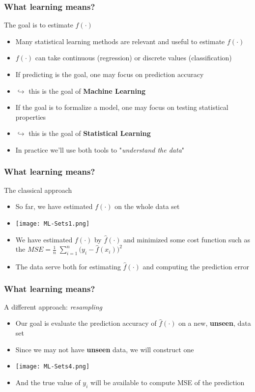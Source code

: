 \documentclass[xcolor=x11names,compress, aspectratio=169]{beamer}
\renewcommand{\(}{\begin{columns}}
\renewcommand{\)}{\end{columns}}
\newcommand{\<}[1]{\begin{column}{#1}}
\renewcommand{\>}{\end{column}}
\begin{document}
\begin{frame}
\frametitle{\textcolor{brique}{ What learning means?}}
The goal is to estimate $f(\cdot)$
\begin{itemize}[<+->]
\item Many statistical learning methods are relevant and useful to estimate $f(\cdot)$
\item $f(\cdot)$ can take continuous (regression) or discrete values (classification)
\item If predicting is the goal, one may focus on prediction accuracy
\item[] $\hookrightarrow $ this is the goal of \textbf{Machine Learning }
\item If the goal is to formalize a model, one may focus on testing statistical properties
\item[] $\hookrightarrow $ this is the goal of \textbf{Statistical Learning }
\item In practice we'll use both tools to  "\emph{understand the data}"

\end{itemize}
\end{frame}


\begin{frame}
\frametitle{\textcolor{brique}{ What learning means?}}
The classical approach
\begin{itemize}[<+->]
\item So far, we have estimated $f(\cdot)$ on the whole data set
\item[] \texttt{[image: ML-Sets1.png]}
\item We have estimated $f(\cdot)$ by $\widehat f(\cdot)$  and minimized some cost function such as the
$ MSE =  \frac{1}{n} \; \sum_ {i=1}^n \bigl( y_i - \widehat f(x_i) \bigr)^2 $
\item The data serve both for estimating $\widehat f(\cdot)$ and computing the prediction error
\end{itemize}
\end{frame}


\begin{frame}
\frametitle{\textcolor{brique}{ What learning means?}}
A different approach: \textit{resampling}
\begin{itemize}[<+->]
\item Our goal is  evaluate the prediction accuracy of $\widehat f(\cdot)$ on a new, \textbf{unseen}, data set
\item Since we may not have \textbf{unseen} data, we will construct one
\item[] \texttt{[image: ML-Sets4.png]}
\item And the true value of $y_i$ will be available to compute MSE of the prediction
\end{itemize}
\end{frame}
\end{document}
